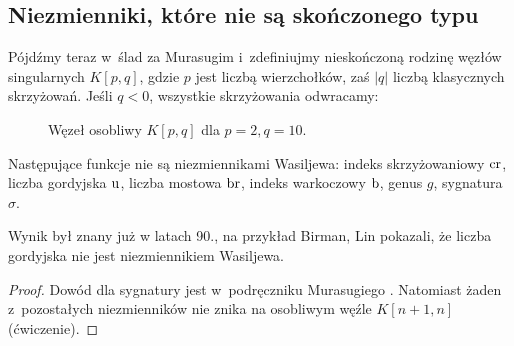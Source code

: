 
\subsection{Niezmienniki, które nie są skończonego typu}
Pójdźmy teraz w~ślad za Murasugim i~zdefiniujmy nieskończoną rodzinę węzłów singularnych $K[p, q]$, gdzie $p$ jest liczbą wierzchołków, zaś $|q|$ liczbą klasycznych skrzyżowań.
Jeśli $q < 0$, wszystkie skrzyżowania odwracamy:
\begin{figure}[H]
    \centering
\begin{comment}
    \begin{tikzpicture}[baseline=-0.65ex, scale=0.1]
    \begin{knot}[clip width=5, end tolerance=1pt, flip crossing/.list={2}]
        \draw[thick] (5, 0) [in=-60, out=-120] to (-5, 0) [in=60, out=120] to (-15, 0) [in=-60, out=-120] to (-25, 0) [in=60, out=120] to (-35, 0) [in=180, out=-120] to (-35, -10);
        \draw[thick] (5, 0) [in=60, out=120] to (-5, 0) [in=-60, out=-120] to (-15, 0) [in=60, out=120] to (-25, 0) [in=-60, out=-120] to (-35, 0) [in=-180, out=120] to (-35, 10);
        \strand[thick] (5, 0) [in=120, out=60] to (15, 0) [in=-120, out=-60] to (25, 0) [in=120, out=60] to (35, 0) [in=0, out=-60] to (35, -10);
        \strand[thick] (5, 0) [in=-120, out=-60] to (15, 0) [in=120, out=60] to (25, 0) [in=-120, out=-60] to (35, 0) [in=0, out=60] to (35, 10);
        \draw[thick,Latex-] (-35, 10) to (35, 10);
        \draw[thick,Latex-] (-35, -10) to (35, -10);
        \draw[black,fill=black] (5,0) circle (0.5);
        \draw[black,fill=black] (-5,0) circle (0.5);
        \draw[black,fill=black] (-15,0) circle (0.5);
        \draw[black,fill=black] (-25,0) circle (0.5);
        \draw[black,fill=black] (-35,0) circle (0.5);
    \end{knot}
    \end{tikzpicture}
\end{comment}
    \caption{Węzeł osobliwy $K[p, q]$ dla $p = 2, q = 10$.}
\end{figure}

\begin{proposition}
%
%
%
%
%
%
    Następujące funkcje nie są niezmiennikami Wasiljewa: indeks skrzyżowaniowy $\operatorname{cr}$, liczba gordyjska $\operatorname{u}$, liczba mostowa $\operatorname{br}$, indeks warkoczowy $\operatorname{b}$, genus $g$, sygnatura $\sigma$.
\end{proposition}

Wynik był znany już w latach 90., na przykład Birman, Lin \cite{birman1993} pokazali, że liczba gordyjska nie jest niezmiennikiem Wasiljewa.
%
%

\begin{proof}
    Dowód dla sygnatury jest w~podręczniku Murasugiego \cite[s. 312]{murasugi1996}.
    Natomiast żaden z~pozostałych niezmienników nie znika na osobliwym węźle $K[n+1, n]$ (ćwiczenie).
\end{proof}

